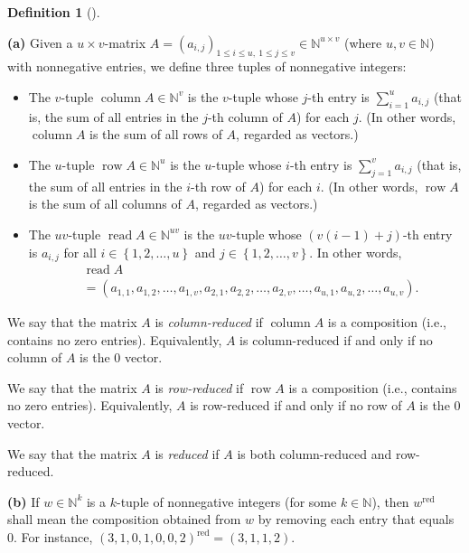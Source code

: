 \documentclass
[numbers=enddot,12pt,final,onecolumn,notitlepage,abstracton]{scrartcl}%
\theoremstyle{definition}
\newtheorem{defi}[theo]{Definition}
\newenvironment{definition}[1][]
{\begin{defi}[#1]\begin{leftbar}}
{\end{leftbar}\end{defi}}
\let\sumnonlimits\sum
\renewcommand{\sum}{\sumnonlimits\limits}
\begin{document}
\begin{definition}
\label{def.QSym.secondcomult}\textbf{(a)} Given a $u\times v$-matrix
$A=\left(  a_{i,j}\right)  _{1\leq i\leq u,\ 1\leq j\leq v}\in\mathbb{N}%
^{u\times v}$ (where $u,v\in\mathbb{N}$) with nonnegative entries, we define
three tuples of nonnegative integers:

\begin{itemize}
\item The $v$-tuple $\operatorname*{column}A\in\mathbb{N}^{v}$ is the
$v$-tuple whose $j$-th entry is $\sum_{i=1}^{u}a_{i,j}$ (that is, the sum of
all entries in the $j$-th column of $A$) for each $j$. (In other words,
$\operatorname*{column}A$ is the sum of all rows of $A$, regarded as vectors.)

\item The $u$-tuple $\operatorname*{row}A\in\mathbb{N}^{u}$ is the $u$-tuple
whose $i$-th entry is $\sum_{j=1}^{v}a_{i,j}$ (that is, the sum of all entries
in the $i$-th row of $A$) for each $i$. (In other words, $\operatorname{row}A$
is the sum of all columns of $A$, regarded as vectors.)

\item The $uv$-tuple $\operatorname*{read}A\in\mathbb{N}^{uv}$ is the
$uv$-tuple whose $\left(  v\left(  i-1\right)  +j\right)  $-th entry is
$a_{i,j}$ for all $i\in\left\{  1,2,\ldots,u\right\}  $ and $j\in\left\{
1,2,\ldots,v\right\}  $. In other words,%
\begin{align*}
&  \operatorname*{read}A\\
&  =\left(  a_{1,1},a_{1,2},\ldots,a_{1,v},a_{2,1},a_{2,2},\ldots
,a_{2,v},\ldots,a_{u,1},a_{u,2},\ldots,a_{u,v}\right)  .
\end{align*}

\end{itemize}

We say that the matrix $A$ is \textit{column-reduced} if
$\operatorname*{column}A$ is a composition (i.e., contains no zero entries).
Equivalently, $A$ is column-reduced if and only if no column of $A$ is the $0$ vector.

We say that the matrix $A$ is \textit{row-reduced} if $\operatorname*{row}A$
is a composition (i.e., contains no zero entries). Equivalently, $A$ is
row-reduced if and only if no row of $A$ is the $0$ vector.

We say that the matrix $A$ is \textit{reduced} if $A$ is both column-reduced
and row-reduced.

\textbf{(b)} If $w\in\mathbb{N}^{k}$ is a $k$-tuple of nonnegative integers
(for some $k\in\mathbb{N}$), then $w^{\operatorname*{red}}$ shall mean the
composition obtained from $w$ by removing each entry that equals $0$. For
instance, $\left(  3,1,0,1,0,0,2\right)  ^{\operatorname*{red}}=\left(
3,1,1,2\right)  $.


\end{definition}
\end{document}
